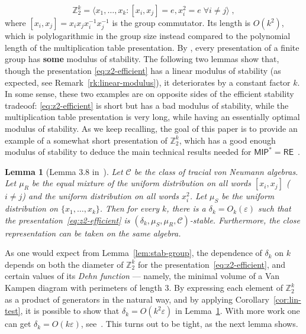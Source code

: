 \documentclass[11pt]{article}
\newtheorem{lemma}[theorem]{Lemma}
\theoremstyle{definition}
\newcommand{\Z}{\ensuremath{\mathbb{Z}}}
\newcommand{\mC}{\ensuremath{\mathcal{C}}}
\newcommand{\eps}{\varepsilon}
\newcommand{\class}[1]{\ensuremath{\mathsf{#1}}\xspace}
\newcommand{\MIP}{\class{MIP}} %
\newcommand{\RE}{\class{RE}} %
\begin{document}
\begin{equation}\label{eq:z2-efficient}
 \Z_2^k = \langle x_1,\ldots,x_k : [x_i,x_j]=e, x_i^2=e \; \forall i\neq j \rangle\;,
\end{equation}
where $[x_i,x_j]=x_ix_jx_i^{-1}x_j^{-1}$ is the group commutator. 
Its length is $O(k^2)$, which is polylogarithmic in the group size instead compared to the polynomial length of the multiplication table presentation. By \cite{hadwin2018stability}, every presentation of a finite group has \textbf{some} modulus of stability.
The following two lemmas show that, though the presentation \eqref{eq:z2-efficient} has a linear modulus of stability (as expected, see Remark~\ref{rk:linear-modulus}), it deteriorates by a constant factor $k$. In some sense, these two examples are on opposite sides of the efficient stability tradeoof: \eqref{eq:z2-efficient} is short but has a bad modulus of stability, while the multiplication table presentation is very long, while having an essentially optimal modulus of stability. As we keep recalling, the goal of this paper is to provide an example of a somewhat short presentation of $\Z_2^k$, which has a good enough modulus of stability to deduce the main technical results needed for $\MIP^*=\RE$~\cite{ji2020mip}.



\begin{lemma}[Lemma 3.8 in~\cite{slofstra2019set}]\label{lem:eff-z2}
Let $\mC$ be the class of tracial von Neumann algebras. Let $\mu_R$ be the equal mixture of the uniform distribution on all words $[x_i,x_j]$ ($i\neq j$) and the uniform distribution on all words $x_i^2$. Let $\mu_S$ be the uniform distribution on $\{x_1,\ldots,x_k\}$. Then 
  for every $k$, there is a $\delta_k = O_k(\eps)$ such that the presentation~\eqref{eq:z2-efficient} is $(\delta_k,\mu_S,\mu_R,\mC)$-stable. Furthermore, the close representation can be taken on the same algebra.
\end{lemma}

As one would expect from Lemma~\ref{lem:stab-group}, the dependence of $\delta_k$ on $k$ depends on both the diameter of $\Z_2^k$ for the presentation~\eqref{eq:z2-efficient}, and certain values of its \emph{Dehn function} --- namely, the minimal volume of a Van Kampen diagram with perimeters of length $3$. By expressing each element of $\Z_2^k$ as a product of generators in the natural way, and by applying Corollary~\ref{cor:lin-test}, it is possible to show that $\delta_k=O(k^2\eps)$ in Lemma~\ref{lem:eff-z2}. With more work one can get $\delta_k=O(k\eps)$, see~\cite[Theorem 3.2]{chao2017overlapping}. This turns out to be  tight, as the next lemma shows. 
\end{document}
